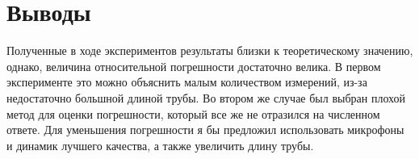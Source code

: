\documentclass[12pt]{article}
\begin{document}
	\section{Выводы}
	Полученные в ходе экспериментов результаты близки к теоретическому значению, однако, величина относительной погрешности достаточно велика. В первом эксперименте это можно объяснить малым количеством измерений, из-за недостаточно большной длиной трубы. Во втором же случае был выбран плохой метод для оценки погрешности, который все же не отразился на численном ответе. Для уменьшения погрешности я бы предложил использовать микрофоны и динамик лучшего качества, а также увеличить длину трубы. 
\end{document}
